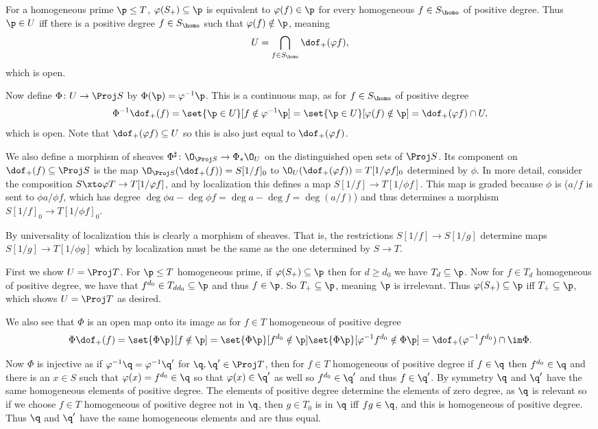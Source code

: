     \item For a homogeneous prime $\p\leq T$, $\phi(S_+)\subseteq\p$ is equivalent to $\phi(f)\in\p$ for every homogeneous $f\in S_\homo$ of positive degree.
    Thus $\p\in U$ iff there is a positive degree $f\in S_\homo$ such that $\phi(f)\notin\p$, meaning
    $$ U = \bigcap_{f\in S_\homo}\dof_+(\phi f) , $$
    which is open.

    Now define $\Phi\colon U\to\Proj S$ by $\Phi(\p)=\phi^{-1}\p$.
    This is a continuous map, as for $f\in S_\homo$ of positive degree
    $$ \Phi^{-1}\dof_+(f) = \set{\p\in U}[f\notin\phi^{-1}\p] = \set{\p\in U}[\phi(f)\notin\p] = \dof_+(\phi f)\cap U , $$
    which is open.
    Note that $\dof_+(\phi f)\subseteq U$ so this is also just equal to $\dof_+(\phi f)$.

    We also define a morphism of sheaves $\Phi^\sharp\colon\O_{\Proj S}\to\Phi_*\O_U$ on the distinguished open sets of $\Proj S$.
    Its component on $\dof_+(f)\subseteq\Proj S$ is the map $\O_{\Proj S}(\dof_+(f))=S[1/f]_0$ to $\O_U(\dof_+(\phi f))=T[1/\phi f]_0$
    determined by $\phi$.
    In more detail, consider the composition $S\xto\phi T\to T[1/\phi f]$, and by localization this defines a map $S[1/f]\to T[1/\phi f]$.
    This map is graded because $\phi$ is ($a/f$ is sent to $\phi a/\phi f$, which has degree $\deg\phi a-\deg\phi f=\deg a-\deg f=\deg(a/f)$)
    and thus determines a morphism $S[1/f]_0\to T[1/\phi f]_0$.

    By universality of localization this is clearly a morphism of sheaves.
    That is, the restrictions $S[1/f]\to S[1/g]$ determine maps $S[1/g]\to T[1/\phi g]$ which by localization must be the same as the one
    determined by $S\to T$.

    \item First we show $U=\Proj T$.
    For $\p\leq T$ homogeneous prime, if $\phi(S_+)\subseteq\p$ then for $d\geq d_0$ we have $T_d\subseteq\p$.
    Now for $f\in T_d$ homogeneous of positive degree, we have that $f^{d_0}\in T_{dd_0}\subseteq\p$ and thus $f\in\p$.
    So $T_+\subseteq\p$, meaning $\p$ is irrelevant.
    Thus $\phi(S_+)\subseteq\p$ iff $T_+\subseteq\p$, which shows $U=\Proj T$ as desired.

    We also see that $\Phi$ is an open map onto its image as for $f\in T$ homogeneous of positive degree
    $$ \Phi\dof_+(f) = \set{\Phi\p}[f\notin\p] = \set{\Phi\p}[f^{d_0}\notin\p] \set{\Phi\p}[\phi^{-1}f^{d_0}\notin\Phi\p] = \dof_+(\phi^{-1}f^{d_0})\cap\im\Phi . $$

    Now $\Phi$ is injective as if $\phi^{-1}\q=\phi^{-1}\q'$ for $\q,\q'\in\Proj T$, then for $f\in T$ homogeneous of positive degree if $f\in\q$ then
    $f^{d_0}\in\q$ and there is an $x\in S$ such that $\phi(x)=f^{d_0}\in\q$ so that $\phi(x)\in\q'$ as well so $f^{d_0}\in\q'$ and thus $f\in\q'$.
    By symmetry $\q$ and $\q'$ have the same homogeneous elements of positive degree.
    The elements of positive degree determine the elements of zero degree, as $\q$ is relevant so if we choose $f\in T$ homogeneous of positive degree not in $\q$,
    then $g\in T_0$ is in $\q$ iff $fg\in\q$, and this is homogeneous of positive degree.
    Thus $\q$ and $\q'$ have the same homogeneous elements and are thus equal.

